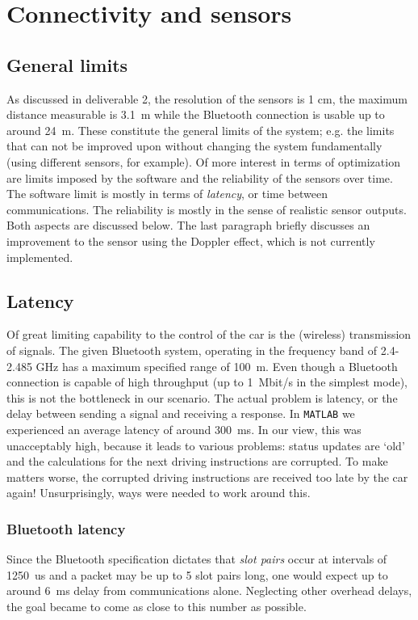 \documentclass[11pt,titlepage]{report}
\begin{document}
\chapter{Connectivity and sensors}
\label{ch:anticollision}
\section{General limits}
As discussed in deliverable 2, the resolution of the sensors is 1 cm, the maximum distance measurable is \SI{3.1}{m} while the Bluetooth connection is usable up to around \SI{24}{m}. These constitute the general limits of the system; e.g. the limits that can not be improved upon without changing the system fundamentally (using different sensors, for example). Of more interest in terms of optimization are limits imposed by the software and the reliability of the sensors over time. The software limit is mostly in terms of \textit{latency}, or time between communications. The reliability is mostly in the sense of realistic sensor outputs. Both aspects are discussed below. The last paragraph briefly discusses an improvement to the sensor using the Doppler effect, which is not currently implemented.

\section{Latency}
Of great limiting capability to the control of the car is the (wireless) transmission of signals. The given Bluetooth system, operating in the frequency band of 2.4-2.485 GHz has a maximum specified range of \SI{100}{m}.  Even though a Bluetooth connection is capable of high throughput (up to \SI{1}{Mbit/s} in the simplest mode), this is not the bottleneck in our scenario. The actual problem is latency, or the delay between sending a signal and receiving a response. In \texttt{MATLAB} we experienced an average latency of around \SI{300}{ms}. In our view, this was unacceptably high, because it leads to various problems: status updates are `old' and the calculations for the next driving instructions are corrupted. To make matters worse, the corrupted driving instructions are received too late by the car again! Unsurprisingly, ways were needed to work around this.
\subsection{Bluetooth latency}
Since the Bluetooth specification dictates that \textit{slot pairs} occur at intervals of \SI{1250}{us} and a packet may be up to 5 slot pairs long, one would expect up to around \SI{6}{ms} delay from communications alone. Neglecting other overhead delays, the goal became to come as close to this number as possible. 
\end{document}
